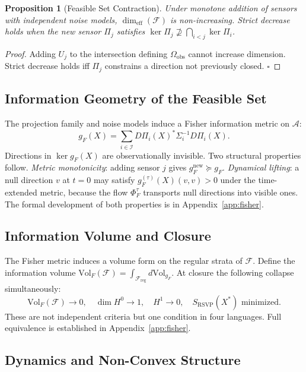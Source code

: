 \documentclass[12pt, oneside]{article}
\newtheorem{proposition}[theorem]{Proposition}
\begin{document}
\begin{proposition}[Feasible Set Contraction]
\label{prop:contraction}
Under monotone addition of sensors with independent noise models, $\dim_{\mathrm{eff}}(\mathcal{F})$
is non-increasing. Strict decrease holds when the new sensor $\Pi_j$ satisfies
$\ker \Pi_j \not\supseteq \bigcap_{i < j} \ker \Pi_i$.
\end{proposition}
\begin{proof}
Adding $U_j$ to the intersection defining $\Omega_{\mathrm{obs}}$ cannot increase
dimension. Strict decrease holds iff $\Pi_j$ constrains a direction not previously closed.
$\square$
\end{proof}

\subsection{Information Geometry of the Feasible Set}

The projection family and noise models induce a Fisher information metric on $\mathcal{A}$:
\[
g_F(X) = \sum_{i \in \mathcal{I}} D\Pi_i(X)^* \Sigma_i^{-1} D\Pi_i(X).
\]
Directions in $\ker g_F(X)$ are observationally invisible. Two structural properties
follow. \emph{Metric monotonicity}: adding sensor $j$ gives
$g_F^{\mathrm{new}} \succeq g_F$. \emph{Dynamical lifting}: a null direction $v$ at
$t = 0$ may satisfy $g_F^{(\tau)}(X)(v,v) > 0$ under the time-extended metric, because
the flow $\Phi_F^\tau$ transports null directions into visible ones. The formal
development of both properties is in Appendix~\ref{app:fisher}.

\subsection{Information Volume and Closure}

The Fisher metric induces a volume form on the regular strata of $\mathcal{F}$. Define
the information volume $\mathrm{Vol}_F(\mathcal{F}) = \int_{\mathcal{F}_{\mathrm{reg}}}
d\mathrm{Vol}_{g_F}$. At closure the following collapse simultaneously:
\[
\mathrm{Vol}_F(\mathcal{F}) \to 0,\quad
\dim H^0 \to 1,\quad
H^1 \to 0,\quad
S_{\mathrm{RSVP}}(X^*) \text{ minimized.}
\]
These are not independent criteria but one condition in four languages.
Full equivalence is established in Appendix~\ref{app:fisher}.

\subsection{Dynamics and Non-Convex Structure}
\end{document}
